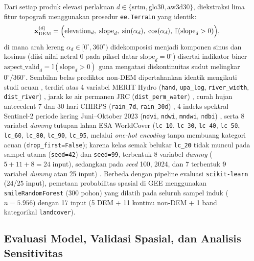 \documentclass[11pt,twoside]{article}
\begin{document}
Dari setiap produk elevasi perlakuan $d \in \{\text{srtm}, \text{glo30}, \text{aw3d30}\}$, diekstraksi lima fitur topografi menggunakan prosedur \texttt{ee.Terrain} yang identik:
\begin{equation}
\mathbf{x}_{\text{DEM}}^{(d)} = \Bigl(\text{elevation}_d,\; \text{slope}_d,\; \sin(\alpha_d),\; \cos(\alpha_d),\; \mathbb{I}(\text{slope}_d > 0)\Bigr),
\label{eq:dem-features-id}
\end{equation}
di mana arah lereng $\alpha_d \in [0^\circ, 360^\circ)$ didekomposisi menjadi komponen sinus dan kosinus (diisi nilai netral $0$ pada piksel datar $\text{slope}_d = 0^\circ$) disertai indikator biner $\text{aspect\_valid}_d = \mathbb{I}(\text{slope}_d > 0)$ guna mengatasi diskontinuitas sudut melingkar $0^\circ/360^\circ$. Sembilan belas prediktor non-DEM dipertahankan identik mengikuti studi acuan \cite{hakim2026}, terdiri atas 4 variabel MERIT Hydro (\texttt{hand}, \texttt{upa\_log}, \texttt{river\_width}, \texttt{dist\_river}) \cite{yamazaki2019}, jarak ke air permanen JRC (\texttt{dist\_perm\_water}) \cite{pekel2016}, curah hujan antecedent 7 dan 30 hari CHIRPS (\texttt{rain\_7d}, \texttt{rain\_30d}) \cite{funk2015}, 4 indeks spektral Sentinel-2 periode kering Juni--Oktober 2023 (\texttt{ndvi}, \texttt{ndwi}, \texttt{mndwi}, \texttt{ndbi}) \cite{saha2021}, serta 8 variabel \textit{dummy} tutupan lahan ESA WorldCover (\texttt{lc\_10}, \texttt{lc\_30}, \texttt{lc\_40}, \texttt{lc\_50}, \texttt{lc\_60}, \texttt{lc\_80}, \texttt{lc\_90}, \texttt{lc\_95}, melalui \textit{one-hot encoding} tanpa membuang kategori acuan (\texttt{drop\_first=False}); karena kelas semak belukar \texttt{lc\_20} tidak muncul pada sampel utama (\texttt{seed=42}) dan \texttt{seed=99}, terbentuk 8 variabel \textit{dummy} ($5 + 11 + 8 = 24$ input), sedangkan pada \textit{seed} 100, 2024, dan 7 terbentuk 9 variabel \textit{dummy} atau 25 input) \cite{zanaga2021}. Berbeda dengan pipeline evaluasi \texttt{scikit-learn} (24/25 input), pemetaan probabilitas spasial di GEE menggunakan \texttt{smileRandomForest} (300 pohon) yang dilatih pada seluruh sampel induk ($n=5.956$) dengan 17 input (5 DEM + 11 kontinu non-DEM + 1 band kategorikal \texttt{landcover}).

\subsection{Evaluasi Model, Validasi Spasial, dan Analisis Sensitivitas}\label{subsec:evaluasi-id}
\end{document}
